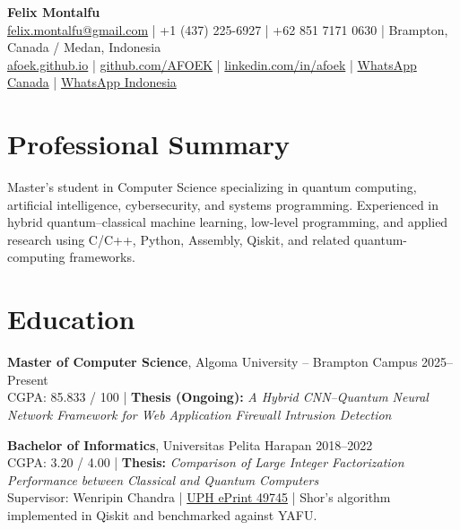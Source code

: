 \documentclass[a4paper,10pt]{article}
\begin{document}

\begin{center}
    {\LARGE\textbf{Felix Montalfu}} \\[-1pt]
    \href{mailto:felix.montalfu@gmail.com}{felix.montalfu@gmail.com}
    \;|\; +1 (437) 225-6927
    \;|\; +62 851 7171 0630
    \;|\; Brampton, Canada / Medan, Indonesia \\[-1pt]
    \href{https://afoek.github.io/}{afoek.github.io}
    \;|\;
    \href{https://github.com/AFOEK}{github.com/AFOEK}
    \;|\;
    \href{https://www.linkedin.com/in/felix-montalfu-263668172}{linkedin.com/in/afoek}
    \;|\;
    \href{https://wa.me/14372256927}{WhatsApp Canada}
    \;|\;
    \href{https://wa.me/6285171710630}{WhatsApp Indonesia}
\end{center}


\section*{Professional Summary}

Master's student in Computer Science specializing in quantum computing,
artificial intelligence, cybersecurity, and systems programming.
Experienced in hybrid quantum--classical machine learning, low-level
programming, and applied research using C/C++, Python, Assembly, Qiskit,
and related quantum-computing frameworks.


\section*{Education}

\textbf{Master of Computer Science}, Algoma University -- Brampton Campus
\hfill 2025--Present \\
CGPA: 85.833 / 100 \;|\;
\textbf{Thesis (Ongoing):}
\textit{A Hybrid CNN--Quantum Neural Network Framework for Web Application Firewall Intrusion Detection}

\textbf{Bachelor of Informatics}, Universitas Pelita Harapan
\hfill 2018--2022 \\
CGPA: 3.20 / 4.00 \;|\;
\textbf{Thesis:}
\textit{Comparison of Large Integer Factorization Performance between Classical and Quantum Computers} \\
Supervisor: Wenripin Chandra \;|\;
\href{http://repository.uph.edu/id/eprint/49745}{UPH ePrint 49745} \;|\;
Shor's algorithm implemented in Qiskit and benchmarked against YAFU.
\end{document}
